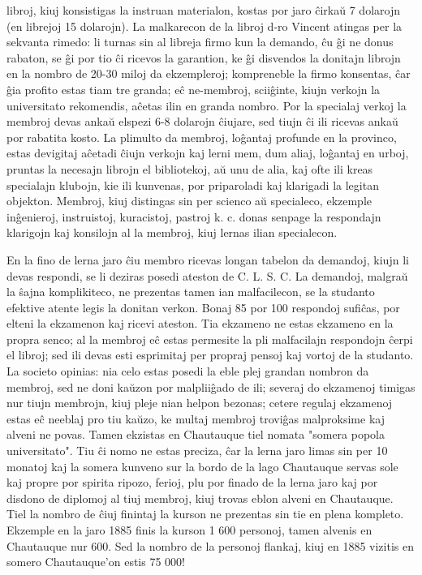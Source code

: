libroj, kiuj konsistigas la instruan materialon, kostas por jaro
\^cirka\u u 7 dolarojn (en librejoj 15 dolarojn). La malkarecon de
la libroj d-ro Vincent atingas per la sekvanta rimedo: li turnas sin
al libreja firmo kun la demando, \^cu \^gi ne donus rabaton, se \^gi
por tio \^ci ricevos la garantion, ke \^gi disvendos la donitajn
librojn en la nombro de 20-30 miloj da ekzempleroj; kompreneble la
firmo konsentas, \^car \^gia profito estas tiam tre granda; e\^c
ne-membroj, scii\^ginte, kiujn verkojn la universitato rekomendis,
a\^cetas ilin en granda nombro. Por la specialaj verkoj la membroj
devas anka\u u elspezi 6-8 dolarojn \^ciujare, sed tiujn \^ci ili
ricevas anka\u u por rabatita kosto. La plimulto da membroj,
lo\^gantaj profunde en la provinco, estas devigitaj a\^cetadi
\^ciujn verkojn kaj lerni mem, dum aliaj, lo\^gantaj en urboj,
pruntas la necesajn librojn el bibliotekoj, a\u u unu de alia, kaj
ofte ili kreas specialajn klubojn, kie ili kunvenas, por priparoladi
kaj klarigadi la legitan objekton. Membroj, kiuj distingas sin per
scienco a\u u specialeco, ekzemple in\^genieroj, instruistoj,
kuracistoj, pastroj k. c. donas senpage la respondajn klarigojn kaj
konsilojn al la membroj, kiuj lernas ilian specialecon.

   En la fino de lerna jaro \^ciu membro ricevas longan tabelon da
demandoj, kiujn li devas respondi, se li deziras posedi ateston de
C. L. S. C. La demandoj, malgra\u u la \^sajna komplikiteco, ne
prezentas tamen ian malfacilecon, se la studanto efektive atente
legis la donitan verkon. Bonaj 85 por 100 respondoj sufi\^cas, por
elteni la ekzamenon kaj ricevi ateston. Tia ekzameno ne estas
ekzameno en la propra senco; al la membroj e\^c estas permesite la
pli malfacilajn respondojn \^cerpi el libroj; sed ili devas esti
esprimitaj per propraj pensoj kaj vortoj de la studanto. La societo
opinias: nia celo estas posedi la eble plej grandan nombron da
membroj, sed ne doni ka\u uzon por malplii\^gado de ili; severaj do
ekzamenoj timigas nur tiujn membrojn, kiuj pleje nian helpon
bezonas; cetere regulaj ekzamenoj estas e\^c neeblaj pro tiu ka\u
uzo, ke multaj membroj trovi\^gas malproksime kaj alveni ne povas.
Tamen ekzistas en Chautauque tiel nomata "somera popola
universitato". Tiu \^ci nomo ne estas preciza, \^car la lerna jaro
limas sin per 10 monatoj kaj la somera kunveno sur la bordo de la
lago Chautauque servas sole kaj propre por spirita ripozo, ferioj,
plu por finado de la lerna jaro kaj por disdono de diplomoj al tiuj
membroj, kiuj trovas eblon alveni en Chautauque. Tiel la nombro de
\^ciuj finintaj la kurson ne prezentas sin tie en plena kompleto.
Ekzemple en la jaro 1885 finis la kurson 1 600 personoj, tamen
alvenis en Chautauque nur 600. Sed la nombro de la personoj flankaj,
kiuj en 1885 vizitis en somero Chautauque'on estis 75 000!

